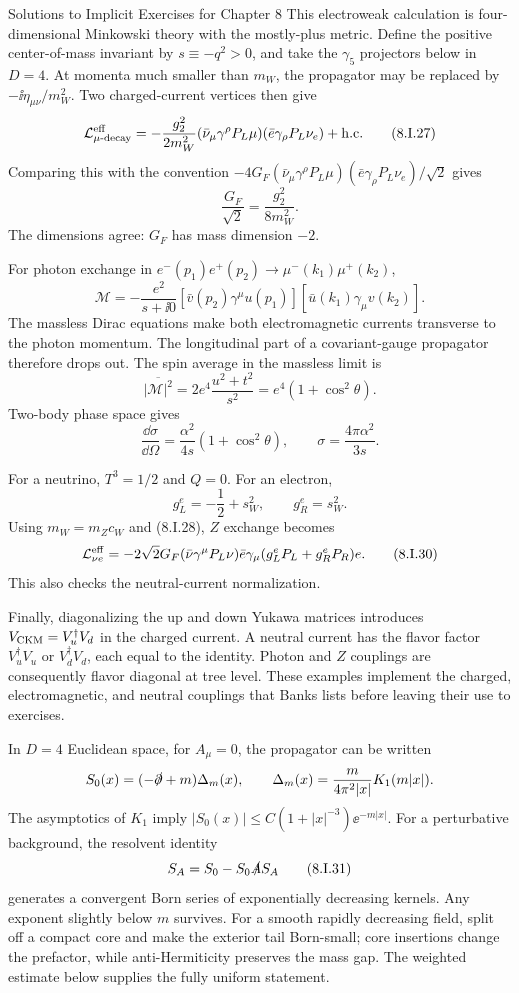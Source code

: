 \begin{bankssolutions}{Solutions to Implicit Exercises for Chapter 8}
This electroweak calculation is four-dimensional Minkowski theory with the
mostly-plus metric.  Define the positive center-of-mass invariant by
$s\equiv-q^2>0$, and take the $\gamma_5$ projectors below in $D=4$.
At momenta much smaller than $m_W$, the propagator may be replaced by
$-\ii\eta_{\mu\nu}/m_W^2$.  Two charged-current vertices then give
\[
 \mathcal L_{\mu\text{-decay}}^{\rm eff}
 =-\frac{g_2^2}{2m_W^2}
 (\bar\nu_\mu\gamma^\rho P_L\mu)
 (\bar e\gamma_\rho P_L\nu_e)+\mathrm{h.c.} \tag{8.I.27}
\]
Comparing this with the convention
$-4G_F(\bar\nu_\mu\gamma^\rho P_L\mu)
(\bar e\gamma_\rho P_L\nu_e)/\sqrt2$ gives
\[
 \frac{G_F}{\sqrt2}=\frac{g_2^2}{8m_W^2}. \tag{8.I.28}
\]
The dimensions agree: $G_F$ has mass dimension $-2$.

For photon exchange in $e^-(p_1)e^+(p_2)\to
\mu^-(k_1)\mu^+(k_2)$,
\[
 \mathcal M=-\frac{e^2}{s+\ii0}
 [\bar v(p_2)\gamma^\mu u(p_1)]
 [\bar u(k_1)\gamma_\mu v(k_2)].
\]
The massless Dirac equations make both electromagnetic currents transverse
to the photon momentum.  The longitudinal part of a covariant-gauge
propagator therefore drops out.
The spin average in the massless limit is
\[
 \overline{|\mathcal M|^2}=2e^4\frac{u^2+t^2}{s^2}
 =e^4(1+\cos^2\theta).
\]
Two-body phase space gives
\[
 \frac{\dd\sigma}{\dd\Omega}
 =\frac{\alpha^2}{4s}(1+\cos^2\theta),
 \qquad \sigma=\frac{4\pi\alpha^2}{3s}. \tag{8.I.29}
\]

For a neutrino, $T^3=1/2$ and $Q=0$.  For an electron,
\[
 g_L^e=-\frac12+s_W^2,\qquad g_R^e=s_W^2.
\]
Using $m_W=m_Zc_W$ and (8.I.28), $Z$ exchange becomes
\[
 \mathcal L_{\nu e}^{\rm eff}
 =-2\sqrt2G_F
 (\bar\nu\gamma^\mu P_L\nu)
 \bar e\gamma_\mu(g_L^eP_L+g_R^eP_R)e. \tag{8.I.30}
\]
This also checks the neutral-current normalization.

Finally, diagonalizing the up and down Yukawa matrices introduces
$V_{\rm CKM}=V_u^\dagger V_d$ in the charged current.  A neutral current has
the flavor factor $V_u^\dagger V_u$ or $V_d^\dagger V_d$, each equal to the
identity.  Photon and $Z$ couplings are consequently flavor diagonal at tree
level.  These examples implement the charged, electromagnetic, and neutral
couplings that Banks lists before leaving their use to exercises.

In $D=4$ Euclidean space, for $A_\mu=0$, the propagator can be written
\[
 S_0(x)=(-\slashed\partial+m)\Delta_m(x),
 \qquad
 \Delta_m(x)=\frac{m}{4\pi^2|x|}K_1(m|x|).
\]
The asymptotics of $K_1$ imply
$|S_0(x)|\le C(1+|x|^{-3})\ee^{-m|x|}$.  For a perturbative background, the
resolvent identity
\[
 S_A=S_0-S_0\slashed A S_A \tag{8.I.31}
\]
generates a convergent Born series of exponentially decreasing kernels.  Any
exponent slightly below $m$ survives.  For a smooth rapidly decreasing field,
split off a compact core and make the exterior tail Born-small; core
insertions change the prefactor, while anti-Hermiticity preserves the mass
gap.  The weighted estimate below supplies the fully uniform statement.


\end{bankssolutions}
